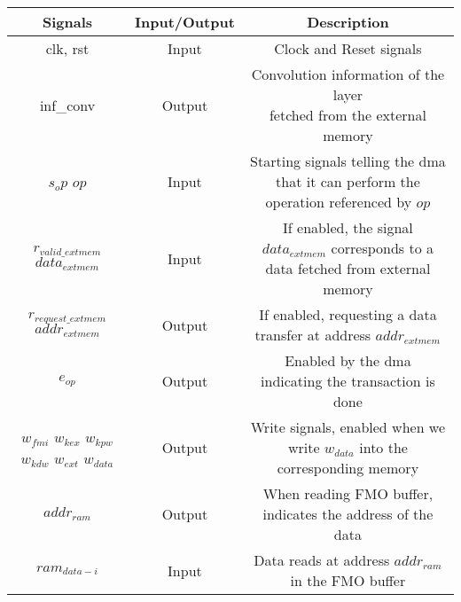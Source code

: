 %
\begin{table}[H]
    \begin{tabular}{c|c|c}
        Signals & Input/Output & Description \\
        \hline \hline
        clk, rst & Input & Clock and Reset signals \\
        \hline
        inf\_conv & Output & \makecell{Convolution information of the layer \\ fetched from the external memory}\\
        \hline
        \makecell{$s_op$ \\ $op$} & Input & \makecell{Starting signals telling the \acrshort{dma} that it can perform \\ the operation referenced by $op$} \\
        \hline
        \makecell{$r_{valid\_extmem}$ \\ $data_{extmem}$} & Input & \makecell{If enabled, the signal $data_{extmem}$ corresponds \\ to a data fetched from external memory} \\
        \hline
        \makecell{$r_{request\_extmem}$ \\ $addr_{extmem}$} & Output & \makecell{If enabled, requesting a data transfer \\ at address $addr_{extmem}$}\\
        \hline
        $e_{op}$ & Output & \makecell{Enabled by the \acrshort{dma} \\ indicating the transaction is done}\\
        \hline
        \makecell{$w_{fmi}$ \\$w_{kex}$\\$w_{kpw}$\\$w_{kdw}$\\$w_{ext}$\\$w_{data}$} & Output & \makecell{Write signals, enabled when \\ we write $w_{data}$ into the corresponding memory}\\
        \hline
        $addr_{ram}$ & Output & \makecell{When reading FMO buffer, \\ indicates the address of the data}\\
        \hline
        $ram_{data-i}$ & Input & \makecell{Data reads at address $addr_{ram}$ \\ in the FMO buffer}\\

\end{tabular}
\end{table}
